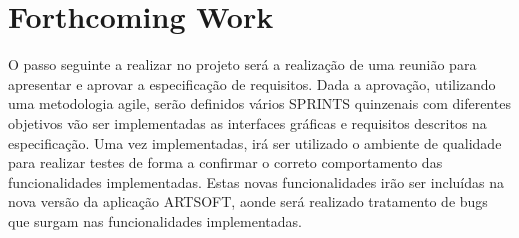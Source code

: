 \documentclass[sigplan]{acmart}
\begin{document}
\section{Forthcoming Work} \label{sec:forthcomingwork}

O passo seguinte a realizar no projeto será a realização de uma reunião para apresentar e aprovar a especificação de requisitos. Dada a aprovação, utilizando uma metodologia agile, serão definidos vários SPRINTS quinzenais com diferentes objetivos vão ser implementadas as interfaces gráficas e requisitos descritos na especificação. Uma vez implementadas, irá ser utilizado o ambiente de qualidade para realizar testes de forma a confirmar o correto comportamento das funcionalidades implementadas. Estas novas funcionalidades irão ser incluídas na nova versão da aplicação ARTSOFT, aonde será realizado tratamento de bugs que surgam nas funcionalidades implementadas.



\end{document}

